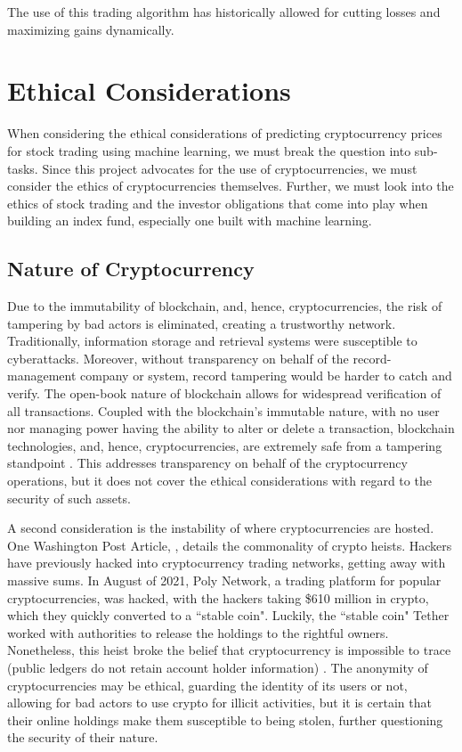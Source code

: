 \documentclass[10pt,twocolumn]{article}
\begin{document}
The use of this trading algorithm has historically allowed for cutting losses and maximizing gains dynamically.


\section{Ethical Considerations}

When considering the ethical considerations of predicting cryptocurrency prices for stock trading using machine learning, we must break the question into sub-tasks. Since this project advocates for the use of cryptocurrencies, we must consider the ethics of cryptocurrencies themselves. Further, we must look into the ethics of stock trading and the investor obligations that come into play when building an index fund, especially one built with machine learning.

\subsection{Nature of Cryptocurrency}

Due to the immutability of blockchain, and, hence, cryptocurrencies, the risk of tampering by bad actors is eliminated, creating a trustworthy network. Traditionally, information storage and retrieval systems were susceptible to cyberattacks. Moreover, without transparency on behalf of the record-management company or system, record tampering would be harder to catch and verify. The open-book nature of blockchain allows for widespread verification of all transactions. Coupled with the blockchain's immutable nature, with no user nor managing power having the ability to alter or delete a transaction, blockchain technologies, and, hence, cryptocurrencies, are extremely safe from a tampering standpoint \cite{WhatIsBlockchain}. This addresses transparency on behalf of the cryptocurrency operations, but it does not cover the ethical considerations with regard to the security of such assets.

A second consideration is the instability of where cryptocurrencies are hosted. One Washington Post Article, , details the commonality of crypto heists. Hackers have previously hacked into cryptocurrency trading networks, getting away with massive sums. In August of 2021, Poly Network, a trading platform for popular cryptocurrencies, was hacked, with the hackers taking 
\$610 million in crypto, which they quickly converted to a ``stable coin". Luckily, the ``stable coin" Tether worked with authorities to release the holdings to the rightful owners. Nonetheless, this heist broke the belief that cryptocurrency is impossible to trace (public ledgers do not retain account holder information) \cite{TrackingStolenCrypto}. The anonymity of cryptocurrencies may be ethical, guarding the identity of its users or not, allowing for bad actors to use crypto for illicit activities, but it is certain that their online holdings make them susceptible to being stolen, further questioning the security of their nature.
\end{document}
